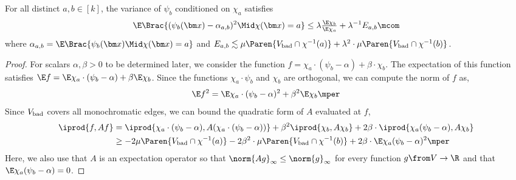 \begin{lemma}
  For all distinct \(a,b\in [k]\), the variance of \(\psi_{b}\) conditioned on \(\chi_{a}\) satisfies
  \begin{equation}
    \E\Brac{ (\psi_{b}(\bm x)-\alpha_{a,b})^{2}\Mid \chi(\bm x)=a}
    \le \lambda \tfrac{\E \chi_{b}}{\E \chi_{a}} + \lambda^{-1} E_{a,b}
    \mcom
  \end{equation}
  where \(\alpha_{a,b}=\E\Brac{\psi_{b}(\bm x)\Mid \chi(\bm x)=a}\) and \(E_{a,b}\lesssim \mu\Paren{\Vbad \cap \chi^{-1}(a)} + \lambda^{2} \cdot \mu\Paren{\Vbad\cap \chi^{-1}(b)}\).
\end{lemma}

\begin{proof}
  For scalars \(\alpha,\beta>0\) to be determined later, we consider the function \(f= \chi_{a} \cdot (\psi_{b}-\alpha) + \beta\cdot \chi_{b}\).
  The expectation of this function satisfies \(\E f =  \E \chi_{a} \cdot (\psi_{b}-\alpha) + \beta \E\chi_{b}\).
  Since the functions \(\chi_{a}\cdot \psi_{b}\) and \(\chi_{b}\) are orthogonal, we can compute the norm of \(f\) as,
  \begin{equation}
    \E f^{2}= \E \chi_{a}\cdot(\psi_{b}-\alpha)^{2} + \beta^{2}\E\chi_{b}
    \mper
  \end{equation}
  Since \(V_{\mathrm{bad}}\) covers all monochromatic edges, we can bound the quadratic form of \(A\) evaluated at \(f\),
  \begin{align}
    \iprod{f,Af}
    &=  \iprod{\chi_{a} \cdot (\psi_{b}-\alpha),A (\chi_{a} \cdot (\psi_{b}-\alpha))} + \beta^{2}\iprod{\chi_{b},A\chi_{b}} + 2\beta\cdot \iprod{\chi_{a}(\psi_{b}-\alpha), A\chi_{b}}\\
    &\ge -2 \mu\Paren{\Vbad \cap \chi^{-1}(a)} - 2 \beta^{2} \cdot \mu\Paren{\Vbad\cap \chi^{-1}(b)} + 2\beta \cdot\E \chi_{a} (\psi_{b}-\alpha)^{2}
    \mper
  \end{align}
  Here, we also use that \(A\) is an expectation operator so that \(\norm{A g}_{\infty}\le \norm{g}_{\infty}\) for every function \(g\from V\to \R\) and that \(\E \chi_{a}(\psi_{b}-\alpha)=0\).
  

\end{proof}
